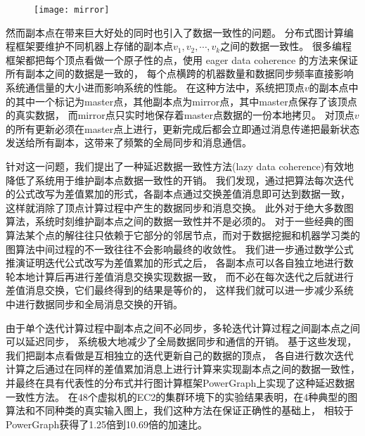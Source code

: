 \begin{figure}[!htbp]
  \centering
  \texttt{[image: mirror]}
  \label{fig:mirror}
\end{figure}

然而副本点在带来巨大好处的同时也引入了数据一致性的问题。
分布式图计算编程框架要维护不同机器上存储的副本点$v_1,v_2,\cdots,v_k$之间的数据一致性。
很多编程框架都把每个顶点看做一个原子性的点，使用 eager data coherence 的方法来保证所有副本之间的数据是一致的，
每个点横跨的机器数量和数据同步频率直接影响系统通信量的大小进而影响系统的性能。
在这种方法中，系统把顶点$v$的副本点中的其中一个标记为master点，其他副本点为mirror点，其中master点保存了该顶点的真实数据，
而mirror点只实时地保存着master点数据的一份本地拷贝。
对顶点$v$的所有更新必须在master点上进行，更新完成后都会立即通过消息传递把最新状态发送给所有副本，这带来了频繁的全局同步和消息通信。

针对这一问题，我们提出了一种延迟数据一致性方法(lazy data coherence)\cite{Wang@PPoPP18}有效地降低了系统用于维护副本点数据一致性的开销。
我们发现，通过把算法每次迭代的公式改写为差值累加的形式，各副本点通过交换差值消息即可达到数据一致，
这样就消除了顶点计算过程中产生的数据同步和消息交换。
此外对于绝大多数图算法，系统时刻维护副本点之间的数据一致性并不是必须的。
对于一些经典的图算法某个点的解往往只依赖于它部分的邻居节点，而对于数据挖掘和机器学习类的图算法中间过程的不一致往往不会影响最终的收敛性。
我们进一步通过数学公式推演证明迭代公式改写为差值累加的形式之后，
各副本点可以各自独立地进行数轮本地计算后再进行差值消息交换实现数据一致，
而不必在每次迭代之后就进行差值消息交换，它们最终得到的结果是等价的，
这样我们就可以进一步减少系统中进行数据同步和全局消息交换的开销。

由于单个迭代计算过程中副本点之间不必同步，多轮迭代计算过程之间副本点之间可以延迟同步，
系统极大地减少了全局数据同步和通信的开销。
基于这些发现，我们把副本点看做是互相独立的迭代更新自己的数据的顶点，
  各自进行数次迭代计算之后通过在同样的差值累加消息上进行计算来实现副本点之间的数据一致性，
并最终在具有代表性的分布式并行图计算框架PowerGraph\cite{Gonzalez@OSDI12}上实现了这种延迟数据一致性方法。
在48个虚拟机的EC2的集群环境下的实验结果表明，在4种典型的图算法和不同种类的真实输入图上，我们这种方法在保证正确性的基础上，
相较于PowerGraph获得了1.25倍到10.69倍的加速比。


